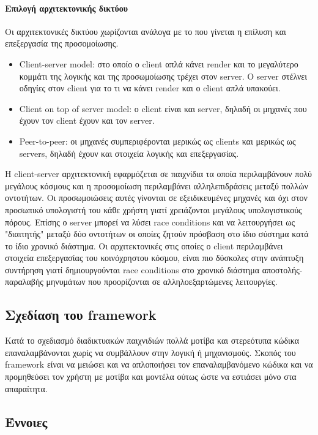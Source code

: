 \documentclass[oneside, 12pt]{book}
\begin{document}
		\paragraph{Επιλογή αρχιτεκτονικής δικτύου}
			Οι αρχιτεκτονικές δικτύου χωρίζονται ανάλογα με το που γίνεται η επίλυση και επεξεργασία της προσομοίωσης.  
		\begin{itemize}	
			\item Client-server model: στο οποίο ο client απλά κάνει render και το μεγαλύτερο κομμάτι της λογικής και της προσωμοίωσης τρέχει στον server. Ο server στέλνει οδηγίες στον client για το τι να κάνει render και ο client απλά υπακούει.
			\item Client on top of server model: ο client είναι και server, δηλαδή οι μηχανές που έχουν τον client έχουν και τον server.
			\item Peer-to-peer: οι μηχανές συμπεριφέρονται μερικώς ως clients και μερικώς ως servers, δηλαδή έχουν και στοιχεία λογικής και επεξεργασίας.
		\end{itemize}
			Η client-server αρχιτεκτονική εφαρμόζεται σε παιχνίδια τα οποία περιλαμβάνουν πολύ μεγάλους κόσμους και η προσομοίωση περιλαμβάνει αλληλεπιδράσεις μεταξύ πολλών οντοτήτων. Οι προσωμοιώσεις αυτές γίνονται σε εξειδικευμένες μηχανές και όχι στον προσωπικό υπολογιστή του κάθε χρήστη γιατί χρειάζονται μεγάλους υπολογιστικούς πόρους. Επίσης ο server μπορεί να λύσει race conditions και να λειτουργήσει ως "διαιτητής" μεταξύ δύο οντοτήτων οι οποίες ζητούν πρόσβαση στο ίδιο σύστημα κατά το ίδιο χρονικό διάστημα. Οι αρχιτεκτονικές στις οποίες ο client περιλαμβάνει στοιχεία επεξεργασίας του κοινόχρηστου κόσμου, είναι πιο δύσκολες στην ανάπτυξη συντήρηση γιατί δημιουργούνται race conditions στο χρονικό διάστημα αποστολής-παραλαβής μηνυμάτων που προορίζονται σε αλληλοεξαρτώμενες λειτουργίες.
			
		\subsection{Σχεδίαση του framework}
		Κατά το σχεδιασμό διαδικτυακών παιχνιδιών πολλά μοτίβα και στερεότυπα κώδικα επαναλαμβάνονται χωρίς να συμβάλλουν στην λογική ή μηχανισμούς. Σκοπός του framework είναι να μειώσει και να απλοποιήσει τον επαναλαμβανόμενο κώδικα και να προμηθεύσει τον χρήστη με μοτίβα και μοντέλα ούτως ώστε να εστιάσει μόνο στα απαραίτητα.
		
		\subsection{Έννοιες}
\end{document}
